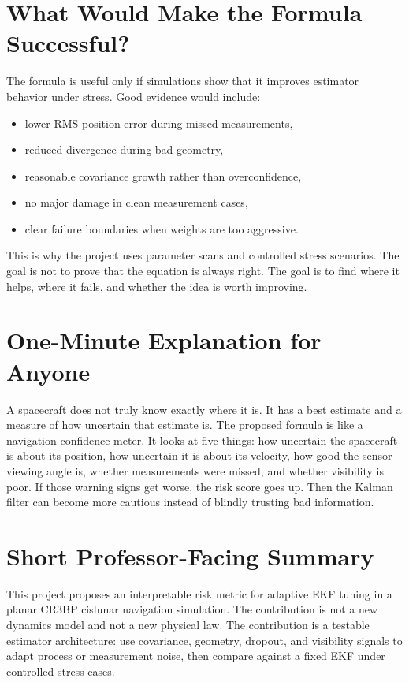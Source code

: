 \documentclass[11pt]{article}
\begin{document}
\section{What Would Make the Formula Successful?}

The formula is useful only if simulations show that it improves estimator
behavior under stress. Good evidence would include:
\begin{itemize}
  \item lower RMS position error during missed measurements,
  \item reduced divergence during bad geometry,
  \item reasonable covariance growth rather than overconfidence,
  \item no major damage in clean measurement cases,
  \item clear failure boundaries when weights are too aggressive.
\end{itemize}
This is why the project uses parameter scans and controlled stress scenarios.
The goal is not to prove that the equation is always right. The goal is to
find where it helps, where it fails, and whether the idea is worth improving.

\section{One-Minute Explanation for Anyone}

A spacecraft does not truly know exactly where it is. It has a best estimate
and a measure of how uncertain that estimate is. The proposed formula is like a
navigation confidence meter. It looks at five things: how uncertain the
spacecraft is about its position, how uncertain it is about its velocity, how
good the sensor viewing angle is, whether measurements were missed, and
whether visibility is poor. If those warning signs get worse, the risk score
goes up. Then the Kalman filter can become more cautious instead of blindly
trusting bad information.

\section{Short Professor-Facing Summary}

This project proposes an interpretable risk metric for adaptive EKF tuning in
a planar CR3BP cislunar navigation simulation. The contribution is not a new
dynamics model and not a new physical law. The contribution is a testable
estimator architecture: use covariance, geometry, dropout, and visibility
signals to adapt process or measurement noise, then compare against a fixed
EKF under controlled stress cases.
\end{document}
